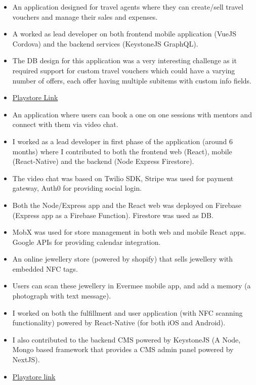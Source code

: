 \documentclass[10pt,a4paper,ragged2e]{altacv}
\begin{document}
\begin{itemize}
\item An application designed for travel agents where they can create/sell travel vouchers and manage their sales and expenses. 
\item A worked as lead developer on both frontend mobile application (VueJS Cordova) and the backend services (KeystoneJS GraphQL).
\item The DB design for this application was a very interesting challenge as it required support for custom travel vouchers which could have a varying number of offers, each offer having multiple subitems with custom info fields.
\item \href{https://play.google.com/store/apps/details?id=com.travx.app}{Playstore Link}
\end{itemize}
\smallskip
\smallskip 


\begin{itemize}
\item An application where users can book a one on one sessions with mentors and connect with them via video chat.
\item I worked as a lead developer in first phase of the application (around 6 months) where I contributed to both the frontend web (React), mobile (React-Native) and the backend (Node Express Firestore).
\item The video chat was based on Twilio SDK, Stripe was used for payment gateway, Auth0 for providing social login. 
\item Both the Node/Express app and the React web was deployed on Firebase (Express app as a Firebase Function). Firestore was used as DB. 
\item MobX was used for store management in both web and mobile React apps. Google APIs for providing calendar integration.
\end{itemize}
\smallskip
\smallskip 



\begin{itemize}
\item An online jewellery store (powered by shopify) that sells jewellery with embedded NFC tags.
\item Users can scan these jewellery in Evermee mobile app, and add a memory (a photograph with text message).
\item I worked on both the fulfillment and user application (with NFC scanning functionality) powered by React-Native (for both iOS and Android). 
\item I also contributed to the backend CMS powered by KeystoneJS (A Node, Mongo based framework that provides a CMS admin panel powered by NextJS).
\item \href{https://play.google.com/store/apps/details?id=com.evermee}{Playstore link}
\end{itemize}
\smallskip
\smallskip
\end{document}
